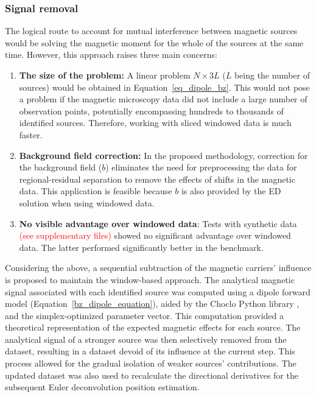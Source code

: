      

\subsubsection{Signal removal} 

    The logical route to account for mutual interference between magnetic sources would be solving the magnetic moment for the whole of the sources at the same time. However, this approach raises three main concerns:
    
    \begin{enumerate}
        \item \textbf{The size of the problem:} A linear problem $N \times 3L$ ($L$ being the number of sources) would be obtained in Equation~\ref{eq_dipole_bz}. This would not pose a problem if the magnetic microscopy data did not include a large number of observation points, potentially encompassing hundreds to thousands of identified sources. Therefore, working with sliced windowed data is much faster.
        
        \item \textbf{Background field correction:} In the proposed methodology, correction for the background field ($b$) eliminates the need for preprocessing the data for regional-residual separation to remove the effects of shifts in the magnetic data. This application is feasible because $b$ is also provided by the ED solution when using windowed data.
        
        \item \textbf{No visible advantage over windowed data}: Tests with synthetic data \textcolor{red}{(see supplementary files)} showed no significant advantage over windowed data. The latter performed significantly better in the benchmark.

    \end{enumerate}
    
    Considering the above, a sequential subtraction of the magnetic carriers' influence is proposed to maintain the window-based approach. The analytical magnetic signal associated with each identified source was computed using a dipole forward model (Equation~\ref{bz_dipole_equation}), aided by the Choclo Python library \citep{choclo2022}, and the simplex-optimized parameter vector. This computation provided a theoretical representation of the expected magnetic effects for each source. The analytical signal of a stronger source was then selectively removed from the dataset, resulting in a dataset devoid of its influence at the current step. This process allowed for the gradual isolation of weaker sources' contributions. The updated dataset was also used to recalculate the directional derivatives for the subsequent Euler deconvolution position estimation.

